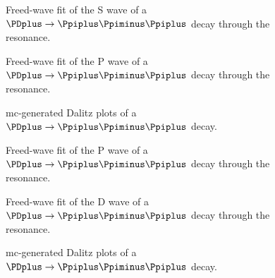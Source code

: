     \begin{figure}
        \centering
        \subfloat[][]{}

        \subfloat[][]{}

        \caption{Freed-wave fit of the S wave of a $\PDplus \to \Ppiplus\Ppiminus\Ppiplus$ decay through the \Pfii{} resonance.~\Star}
    \end{figure}

    \begin{figure}
        \centering
        \subfloat[][]{}

        \subfloat[][]{}

        \caption{Freed-wave fit of the P wave of a $\PDplus \to \Ppiplus\Ppiminus\Ppiplus$ decay through the \Pfii{} resonance.~\Star}
    \end{figure}

    \begin{figure}
        \centering
        \subfloat[][]{}

        \subfloat[][]{}
        \caption{\ac{mc}-generated Dalitz plots of a $\PDplus \to \Ppiplus\Ppiminus\Ppiplus$ decay.~}
    \end{figure}

    \begin{figure}
        \centering
        \subfloat[][]{}

        \subfloat[][]{}

        \caption{Freed-wave fit of the P wave of a $\PDplus \to \Ppiplus\Ppiminus\Ppiplus$ decay through the \Prhozero{} resonance.~\Square}
    \end{figure}
    \begin{figure}
        \centering
        \subfloat[][]{}

        \subfloat[][]{}

        \caption{Freed-wave fit of the D wave of a $\PDplus \to \Ppiplus\Ppiminus\Ppiplus$ decay through the \Pfii{} resonance.~\Square}
    \end{figure}
    \begin{figure}
        \centering

        \caption{\ac{mc}-generated Dalitz plots of a $\PDplus \to \Ppiplus\Ppiminus\Ppiplus$ decay.~\Square}
    \end{figure}

